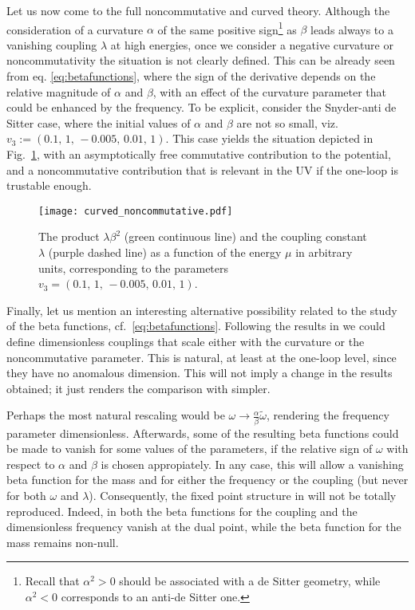 \documentclass[a4paper,10pt]{amsart}
\newcommand{\nocol}[1]{{#1}}
\begin{document}
Let us now come to the full noncommutative and curved theory.
Although the consideration of a curvature $\alpha$ of the same
positive sign\footnote{Recall that $\alpha^2>0$ should be associated with a de Sitter geometry,
while $\alpha^2<0$ corresponds to an anti-de Sitter one.}
as $\beta$ leads always to a vanishing coupling $\lambda$ at high energies,
once we consider a negative curvature or noncommutativity the situation is not clearly defined.
This can be already seen from eq. \eqref{eq:betafunctions}, where the sign of the derivative
depends on the relative magnitude of $\alpha$ and $\beta$,
with an effect of the curvature parameter that could be enhanced by the frequency.
To be explicit, consider the Snyder-anti de Sitter case, where the initial values of $\alpha$ and $\beta$ are not so small,
viz.~$v_3:=(0.1,\,1,\,-0.005,\,0.01,\,1)$.
This case yields the situation depicted in Fig.~\ref{fig:running_oppositesign},
with an asymptotically free commutative contribution to the potential,
and a noncommutative contribution that is relevant in the UV if the one-loop is trustable enough.
\begin{figure}[h!]
  \begin{minipage}{0.48\textwidth}
 \begin{center}
 \texttt{[image: curved\_noncommutative.pdf]}
 \end{center}

 \end{minipage}
 \caption{The product $\lambda\beta^2$ (green continuous line) and the coupling constant $\lambda$ (purple dashed line) as a function of the energy $\mu$ in arbitrary units,
 corresponding to the parameters $v_3=(0.1,\,1,\,-0.005,\,0.01,\,1)$.}
 \label{fig:running_oppositesign}

 \end{figure}

Finally, let us mention an interesting alternative possibility related to the study of the beta functions,
cf.~\eqref{eq:betafunctions}.
\nocol{Following the results in \cite{Grosse:2005da} we could define dimensionless couplings that scale
either with the curvature or the noncommutative parameter.
This is natural, at least at the one-loop level, since they have no anomalous dimension.
This will not imply a change in the results obtained; it just renders the comparison with \cite{Grosse:2005da, Grosse:2004by} simpler.}

Perhaps the most natural rescaling would be $\omega\rightarrow \frac{\alpha}{\beta}\tilde\omega$, rendering the frequency parameter dimensionless.
Afterwards, some of the resulting beta functions could be made to vanish for some values of the parameters,
if the relative sign of $\omega$ with respect to $\alpha$ and $\beta$ is chosen appropiately.
In any case, this will allow a vanishing beta function for the mass and for either the frequency or the coupling (but never for both $\omega$ and $\lambda$).
Consequently, the fixed point structure in \cite{Grosse:2004by} will not be totally reproduced.
\nocol{Indeed, in \cite{Grosse:2004by} both the beta functions for the coupling and the dimensionless frequency vanish at the dual point,
while the beta function for the mass remains non-null.}
\end{document}
